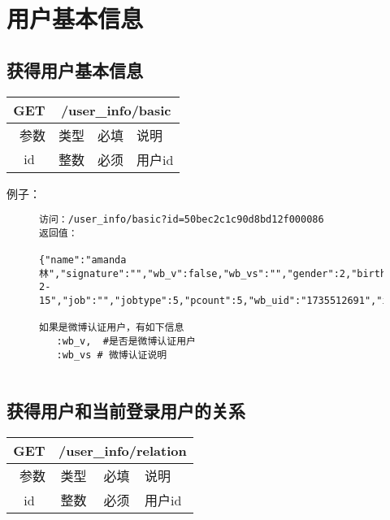 

\section{用户基本信息}


\subsection{获得用户基本信息}

\begin{table}[H]
   \begin{center}
\begin{tabular}{|c|c|c|p{12cm}|}
\hline
GET & \multicolumn{3}{|c|}{/user\_info/basic} \\
\hline\hline
 \  参数  & 类型 & 必填 &  说明  \\
\hline
 id  & 整数 & 必须 &  用户id\\
\hline
\end{tabular}
   \end{center}
\end{table}



例子：

\begin{figure}[H]
\begin{verbatim}
访问：/user_info/basic?id=50bec2c1c90d8bd12f000086
返回值：

{"name":"amanda林","signature":"","wb_v":false,"wb_vs":"","gender":2,"birthday":"1986-2-15","job":"","jobtype":5,"pcount":5,"wb_uid":"1735512691","id":"50bec2c1c90d8bd12f000086","logo":"http://oss.aliyuncs.com/logo/50fe370ec90d8b173a00023c/0.jpg","logo_thumb":"http://oss.aliyuncs.com/logo/50fe370ec90d8b173a00023c/t1_0.jpg","logo_thumb2":"http://oss.aliyuncs.com/logo/50fe370ec90d8b173a00023c/t2_0.jpg"}

如果是微博认证用户，有如下信息
   :wb_v,  #是否是微博认证用户
   :wb_vs # 微博认证说明
  
\end{verbatim}
\end{figure}



\subsection{获得用户和当前登录用户的关系}

\begin{table}[H]
   \begin{center}
\begin{tabular}{|c|c|c|p{12cm}|}
\hline
GET & \multicolumn{3}{|c|}{/user\_info/relation} \\
\hline\hline
 \  参数  & 类型 & 必填 &  说明  \\
\hline
 id  & 整数 & 必须 &  用户id\\
\hline
\end{tabular}
   \end{center}
\end{table}


